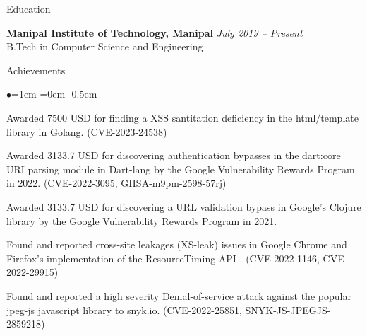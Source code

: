 \documentclass{resume} %
\date{\today}
\begin{document}
\begin{rSection}{Education}

{\bf Manipal Institute of Technology, Manipal} \hfill {\em July 2019 -- Present}  \\ B.Tech in Computer Science and Engineering\hfill
\end{rSection}
\begin{rSection}{Achievements}
\begin{list}{$\bullet$}{\leftmargin=1em \itemindent=0em}
\itemsep -0.5em
\item Awarded 7500 USD for finding a XSS santitation deficiency in the html/template library in Golang. (CVE-2023-24538)
\item Awarded 3133.7 USD for discovering authentication bypasses in the dart:core URI parsing module in Dart-lang by the Google Vulnerability Rewards Program in 2022. (CVE-2022-3095, GHSA-m9pm-2598-57rj)
\item Awarded 3133.7 USD for discovering a URL validation bypass in Google's Clojure library by the Google Vulnerability Rewards Program in 2021.
\item Found and reported cross-site leakages (XS-leak) issues in Google Chrome and Firefox's implementation of the ResourceTiming API . (CVE-2022-1146, CVE-2022-29915)
\item Found and reported a high severity Denial-of-service attack against the popular jpeg-js javascript library to snyk.io. (CVE-2022-25851, SNYK-JS-JPEGJS-2859218)
\end{list}
\end{rSection}
\end{document}
